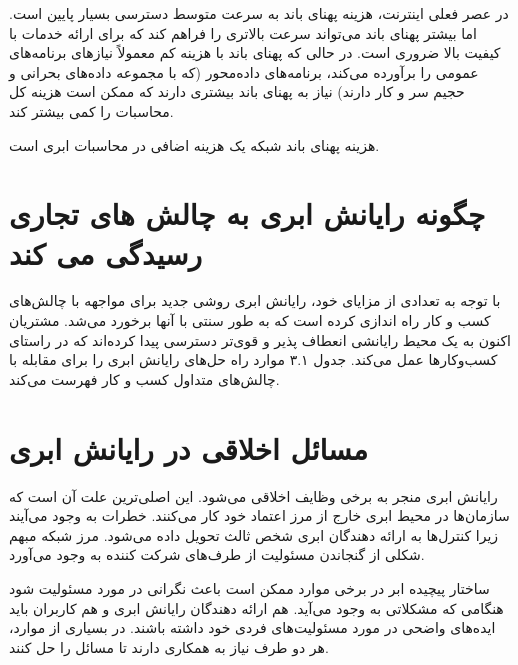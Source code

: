 \documentclass{book}
\begin{document}
        در عصر فعلی اینترنت، هزینه پهنای باند به سرعت متوسط دسترسی بسیار پایین است. اما بیشتر پهنای باند می‌تواند سرعت بالاتری را فراهم کند که برای ارائه خدمات با کیفیت بالا ضروری است. در حالی که پهنای باند با هزینه کم معمولاً نیازهای برنامه‌های عمومی را برآورده می‌کند، برنامه‌های داده‌محور (که با مجموعه داده‌های بحرانی و حجیم سر و کار دارند) نیاز به پهنای باند بیشتری دارند که ممکن است هزینه کل محاسبات را کمی بیشتر کند.

        \begin{addinfo}
            
            هزینه پهنای باند شبکه یک هزینه اضافی در محاسبات ابری است.
            
        \end{addinfo}
        


        \section{چگونه رایانش ابری به چالش های تجاری رسیدگی می کند}

            با توجه به تعدادی از مزایای خود، رایانش ابری روشی جدید برای مواجهه با چالش‌های کسب و کار راه اندازی کرده است که به طور سنتی با آنها برخورد می‌شد. مشتریان اکنون به یک محیط رایانشی انعطاف پذیر و قوی‌تر دسترسی پیدا کرده‌اند که در راستای کسب‌وکارها عمل می‌کند. جدول ۳.۱ موارد راه حل‌های رایانش ابری را برای مقابله با چالش‌های متداول کسب و کار فهرست می‌کند.

        \section{مسائل اخلاقی در رایانش ابری}

            رایانش ابری منجر به برخی وظایف اخلاقی می‌شود. این اصلی‌ترین علت آن است که سازمان‌ها در محیط ابری خارج از مرز اعتماد خود کار می‌کنند. خطرات به وجود می‌آیند زیرا کنترل‌ها به ارائه دهندگان ابری شخص ثالث تحویل داده می‌شود. مرز شبکه مبهم شکلی از گنجاندن مسئولیت از طرف‌های شرکت کننده به وجود می‌آورد.

            ساختار پیچیده ابر در برخی موارد ممکن است باعث نگرانی در مورد مسئولیت شود هنگامی که مشکلاتی به وجود می‌آید. هم ارائه دهندگان رایانش ابری و هم کاربران باید ایده‌های واضحی در مورد مسئولیت‌های فردی خود داشته باشند. در بسیاری از موارد، هر دو طرف نیاز به همکاری دارند تا مسائل را حل کنند.
        
\end{document}
